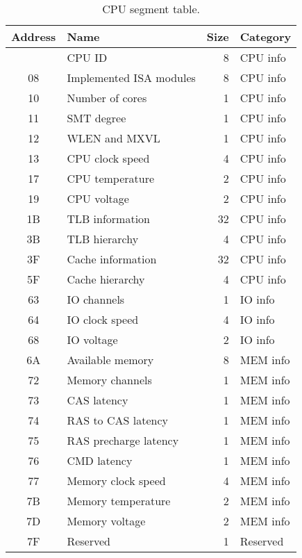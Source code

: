 \begin{table}[hbt!] %

    \begin{center}

    \begin{tabular}{|c|l|r|l|}

        \hline
        Address & Name & Size & Category\\
        \hline
        \addlinespace[10pt]
        \hline
        00 & CPU ID & 8 & CPU info\\
        \hline
        08 & Implemented ISA modules & 8 & CPU info\\
        \hline
        10 & Number of cores & 1 & CPU info\\
        \hline
        11 & SMT degree & 1 & CPU info\\
        \hline
        12 & WLEN and MXVL & 1 & CPU info\\
        \hline
        13 & CPU clock speed & 4 & CPU info\\
        \hline
        17 & CPU temperature & 2 & CPU info\\
        \hline
        19 & CPU voltage & 2 & CPU info\\
        \hline
        1B & TLB information & 32 & CPU info\\
        \hline
        3B & TLB hierarchy & 4 & CPU info\\
        \hline
        3F & Cache information & 32 & CPU info\\
        \hline
        5F & Cache hierarchy & 4 & CPU info\\
        \hline
        63 & IO channels & 1 & IO info\\
        \hline
        64 & IO clock speed & 4 & IO info\\
        \hline
        68 & IO voltage & 2 & IO info\\
        \hline
        6A & Available memory & 8 & MEM info\\
        \hline
        72 & Memory channels & 1 & MEM info\\
        \hline
        73 & CAS latency & 1 & MEM info\\
        \hline
        74 & RAS to CAS latency & 1 & MEM info\\
        \hline
        75 & RAS precharge latency & 1 & MEM info\\
        \hline
        76 & CMD latency & 1 & MEM info\\
        \hline
        77 & Memory clock speed & 4 & MEM info\\
        \hline
        7B & Memory temperature & 2 & MEM info\\
        \hline
        7D & Memory voltage & 2 & MEM info\\
        \hline
        7F & Reserved & 1 & Reserved\\
        \hline

    \end{tabular}

    \caption[CPU segment table]{CPU segment table.}

    \end{center}

\end{table}